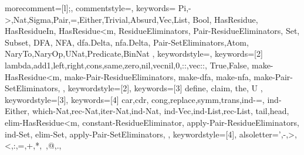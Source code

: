 
\newcommand\orange{\color[HTML]{f08c0a}}
\newcommand\lime{\color[HTML]{20b027}}

 {
	morecomment=[l]{;},
	commentstyle={\color[HTML]{7f7f7f}\slshape},
	keywords={
        Pi,->,Nat,Sigma,Pair,=,Either,Trivial,Absurd,Vec,List,
        Bool, HasResidue, HasResidueIn, HasResidue<m, ResidueEliminators, Pair-ResidueEliminators,
        Set, Subset, DFA, NFA, dfa.Delta, nfa.Delta,
        Pair-SetEliminators,Atom,
        NaryTo,NaryOp,UNat,Predicate,BinNat
    },
    keywordstyle=\orange,
	keywords={[2]
        lambda,add1,left,right,cons,same,zero,nil,vecnil,0,::,vec::,
        True,False, make-HasResidue<m, make-Pair-ResidueEliminators,
        make-dfa, make-nfa,
        make-Pair-SetEliminators,
    },
    keywordstyle={[2]\lime},
    keywords={[3]
        define, claim, the, U
    },
    keywordstyle={[3]\color[HTML]{0000ff}},
    keywords={[4]
        car,cdr,
        cong,replace,symm,trans,ind-=,
        ind-Either,
        which-Nat,rec-Nat,iter-Nat,ind-Nat,
        ind-Vec,ind-List,rec-List,
        tail,head,
        elim-HasResidue<m, constant-ResidueEliminator, apply-Pair-ResidueEliminators,
        ind-Set, elim-Set, apply-Pair-SetEliminators,
    },
    keywordstyle={[4]\color[HTML]{03a688}},
	alsoletter={',-,>,<,:,=,+,*,~,@,.},
}